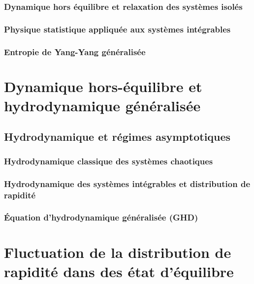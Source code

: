 \subsection{Dynamique hors équilibre et relaxation des systèmes isolés}
\subsection{Physique statistique appliquée aux systèmes intégrables}

\subsection{Entropie de Yang-Yang généralisée}



\chapter{Dynamique hors-équilibre et hydrodynamique généralisée}
\minitoc
\section{Hydrodynamique et régimes asymptotiques}

\subsection{Hydrodynamique classique des systèmes chaotiques}
\subsection{Hydrodynamique des systèmes intégrables et distribution de rapidité}
\subsection{Équation d’hydrodynamique généralisée (GHD)}

\chapter{Fluctuation de la distribution de rapidité dans des état d'équilibre} 


